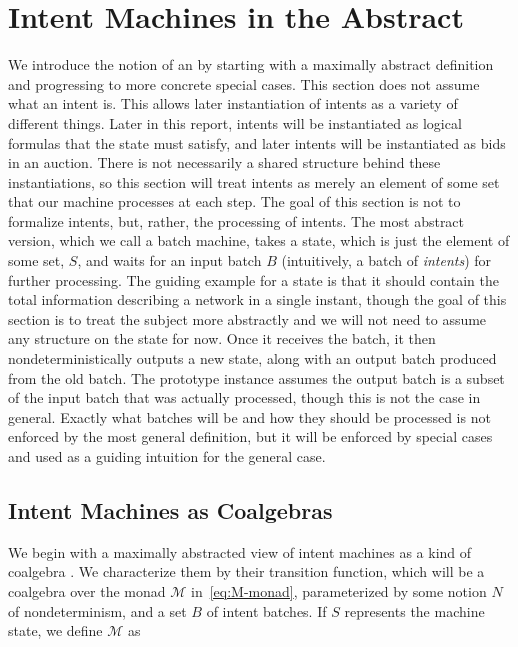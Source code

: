 \section{Intent Machines in the Abstract}\label{sec:abstract}

We introduce the notion of an  by starting with a maximally abstract definition and progressing to more concrete special cases. This section does not assume what an intent is. This allows later instantiation of intents as a variety of different things. Later in this report, intents will be instantiated as logical formulas that the state must satisfy, and later intents will be instantiated as bids in an auction. There is not necessarily a shared structure behind these instantiations, so this section will treat intents as merely an element of some set that our machine processes at each step. The goal of this section is not to formalize intents, but, rather, the processing of intents. The most abstract version, which we call a batch machine, takes a state, which is just the element of some set, $S$, and waits for an input batch $B$ (intuitively, a batch of \textit{intents}) for further processing. The guiding example for a state is that it should contain the total information describing a network in a single instant, though the goal of this section is to treat the subject more abstractly and we will not need to assume any structure on the state for now. Once it receives the batch, it then nondeterministically outputs a new state, along with an output batch produced from the old batch. The prototype instance assumes the output batch is a subset of the input batch that was actually processed, though this is not the case in general. Exactly what batches will be and how they should be processed is not enforced by the most general definition, but it will be enforced by special cases and used as a guiding intuition for the general case.

\subsection{Intent Machines as Coalgebras}

We begin with a maximally abstracted view of intent machines as a kind of coalgebra \citep{jacobs2017introduction}. We characterize them by their transition function, which will be a coalgebra over the monad $\mathcal{M}$ in~\eqref{eq:M-monad}, parameterized by some notion $N$ of nondeterminism, and a set $B$ of intent batches. If
$S$ represents the machine state, we define $\mathcal{M}$ as

